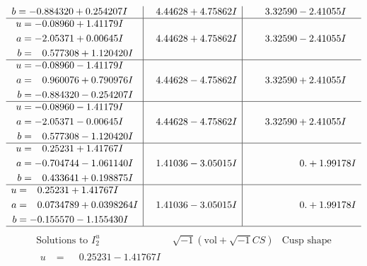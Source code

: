 \documentclass[1p]{elsarticle_modified}
\theoremstyle{definition}
\newcommand{\I}{\sqrt{-1}}
\begin{document}
$$\begin{array}{c|c|c}
\begin{aligned}
b &= -0.884320 + 0.254207 I\end{aligned}
 & \phantom{-}4.44628 + 4.75862 I & \phantom{-}3.32590 - 2.41055 I \\ \hline\begin{aligned}
u &= -0.08960 + 1.41179 I \\
a &= -2.05371 + 0.00645 I \\
b &= \phantom{-}0.577308 + 1.120420 I\end{aligned}
 & \phantom{-}4.44628 + 4.75862 I & \phantom{-}3.32590 - 2.41055 I \\ \hline\begin{aligned}
u &= -0.08960 - 1.41179 I \\
a &= \phantom{-}0.960076 + 0.790976 I \\
b &= -0.884320 - 0.254207 I\end{aligned}
 & \phantom{-}4.44628 - 4.75862 I & \phantom{-}3.32590 + 2.41055 I \\ \hline\begin{aligned}
u &= -0.08960 - 1.41179 I \\
a &= -2.05371 - 0.00645 I \\
b &= \phantom{-}0.577308 - 1.120420 I\end{aligned}
 & \phantom{-}4.44628 - 4.75862 I & \phantom{-}3.32590 + 2.41055 I \\ \hline\begin{aligned}
u &= \phantom{-}0.25231 + 1.41767 I \\
a &= -0.704744 - 1.061140 I \\
b &= \phantom{-}0.433641 + 0.198875 I\end{aligned}
 & \phantom{-}1.41036 - 3.05015 I & \phantom{-0.000000 -}0. + 1.99178 I \\ \hline\begin{aligned}
u &= \phantom{-}0.25231 + 1.41767 I \\
a &= \phantom{-}0.0734789 + 0.0398264 I \\
b &= -0.155570 - 1.155430 I\end{aligned}
 & \phantom{-}1.41036 - 3.05015 I & \phantom{-0.000000 -}0. + 1.99178 I\\
 \hline 
 \end{array}$$\newpage$$\begin{array}{c|c|c}  
\text{Solutions to }I^u_{2}& \I (\text{vol} + \sqrt{-1}CS) & \text{Cusp shape}\\
 \hline 
\begin{aligned}
u &= \phantom{-}0.25231 - 1.41767 I \\

\end{aligned}
\end{array}$$
\end{document}
